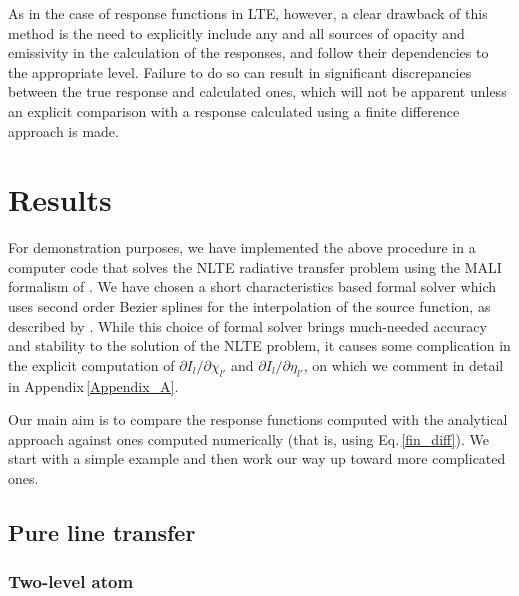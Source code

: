 \documentclass{aa}
\begin{document}
As in the case of response functions in LTE, however, a clear drawback of this method is the need to explicitly include any and all sources of opacity and emissivity in the calculation of the responses, and follow their dependencies to the appropriate level. Failure to do so can result in significant discrepancies between the true response and calculated ones, which will not be apparent unless an explicit comparison with a response calculated using a finite difference approach is made.

\section{Results}

For demonstration purposes, we have implemented the above procedure in a computer code that solves the NLTE radiative transfer problem using the MALI formalism of \citet{RH1}. We have chosen a short characteristics based formal solver which uses second order Bezier splines for the interpolation of the source function, as described by \citet{JaimeBezier}. While this choice of formal solver brings much-needed accuracy and stability to the solution of the NLTE problem, it causes some complication in the explicit computation of $\partial I_l/\partial \chi_{l'}$ and $\partial I_l/\partial \eta_{l'}$, on which we comment in detail in Appendix\,\ref{Appendix_A}.

Our main aim is to compare the response functions computed with the analytical approach against ones computed numerically (that is, using Eq.\,\ref{fin_diff}). We start with a simple example and then work our way up toward more complicated ones. 

\subsection{Pure line transfer}

\subsubsection{Two-level atom}
\end{document}
